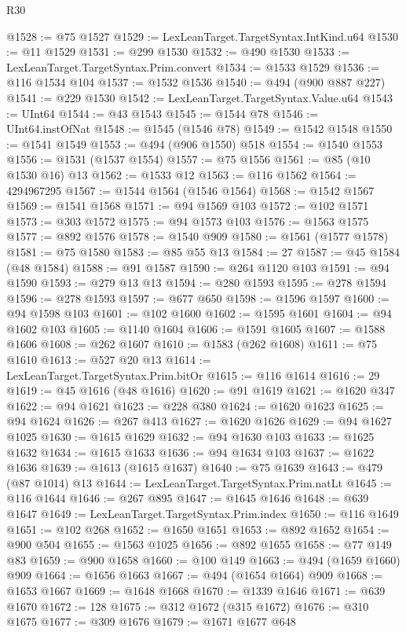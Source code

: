 \begin{lexlean}{R30}
\begin{coremodule}
@1528 := @75 @1527
@1529 := LexLeanTarget.TargetSyntax.IntKind.u64
@1530 := @11 @1529
@1531 := @299 @1530
@1532 := @490 @1530
@1533 := LexLeanTarget.TargetSyntax.Prim.convert
@1534 := @1533 @1529
@1536 := @116 @1534 @104
@1537 := @1532 @1536
@1540 := @494 (@900 @887 @227)
@1541 := @229 @1530
@1542 := LexLeanTarget.TargetSyntax.Value.u64
@1543 := UInt64
@1544 := @43 @1543
@1545 := @1544 @78
@1546 := UInt64.instOfNat
@1548 := @1545 (@1546 @78)
@1549 := @1542 @1548
@1550 := @1541 @1549
@1553 := @494 (@906 @1550) @518
@1554 := @1540 @1553
@1556 := @1531 (@1537 @1554)
@1557 := @75 @1556
@1561 := @85 (@10 @1530 @16) @13
@1562 := @1533 @12
@1563 := @116 @1562
@1564 := 4294967295
@1567 := @1544 @1564 (@1546 @1564)
@1568 := @1542 @1567
@1569 := @1541 @1568
@1571 := @94 @1569 @103
@1572 := @102 @1571
@1573 := @303 @1572
@1575 := @94 @1573 @103
@1576 := @1563 @1575
@1577 := @892 @1576
@1578 := @1540 @909
@1580 := @1561 (@1577 @1578)
@1581 := @75 @1580
@1583 := @85 @55 @13
@1584 := 27
@1587 := @45 @1584 (@48 @1584)
@1588 := @91 @1587
@1590 := @264 @1120 @103
@1591 := @94 @1590
@1593 := @279 @13 @13
@1594 := @280 @1593
@1595 := @278 @1594
@1596 := @278 @1593
@1597 := @677 @650
@1598 := @1596 @1597
@1600 := @94 @1598 @103
@1601 := @102 @1600
@1602 := @1595 @1601
@1604 := @94 @1602 @103
@1605 := @1140 @1604
@1606 := @1591 @1605
@1607 := @1588 @1606
@1608 := @262 @1607
@1610 := @1583 (@262 @1608)
@1611 := @75 @1610
@1613 := @527 @20 @13
@1614 := LexLeanTarget.TargetSyntax.Prim.bitOr
@1615 := @116 @1614
@1616 := 29
@1619 := @45 @1616 (@48 @1616)
@1620 := @91 @1619
@1621 := @1620 @347
@1622 := @94 @1621
@1623 := @228 @380
@1624 := @1620 @1623
@1625 := @94 @1624
@1626 := @267 @413
@1627 := @1620 @1626
@1629 := @94 @1627 @1025
@1630 := @1615 @1629
@1632 := @94 @1630 @103
@1633 := @1625 @1632
@1634 := @1615 @1633
@1636 := @94 @1634 @103
@1637 := @1622 @1636
@1639 := @1613 (@1615 @1637)
@1640 := @75 @1639
@1643 := @479 (@87 @1014) @13
@1644 := LexLeanTarget.TargetSyntax.Prim.natLt
@1645 := @116 @1644
@1646 := @267 @895
@1647 := @1645 @1646
@1648 := @639 @1647
@1649 := LexLeanTarget.TargetSyntax.Prim.index
@1650 := @116 @1649
@1651 := @102 @268
@1652 := @1650 @1651
@1653 := @892 @1652
@1654 := @900 @504
@1655 := @1563 @1025
@1656 := @892 @1655
@1658 := @77 @149 @83
@1659 := @900 @1658
@1660 := @100 @149
@1663 := @494 (@1659 @1660) @909
@1664 := @1656 @1663
@1667 := @494 (@1654 @1664) @909
@1668 := @1653 @1667
@1669 := @1648 @1668
@1670 := @1339 @1646
@1671 := @639 @1670
@1672 := 128
@1675 := @312 @1672 (@315 @1672)
@1676 := @310 @1675
@1677 := @309 @1676
@1679 := @1671 @1677 @648

\end{coremodule}
\end{lexlean}
